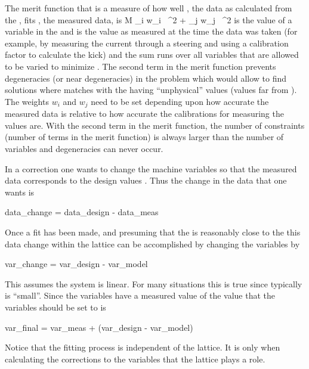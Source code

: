 The merit function  that is a measure of how
well , the data as calculated from the , fits
, the measured data, is
\Begineq
  {\cal M} \equiv \sum_{i} w_i \,
    ^2 + 
  \sum_{j} w_j \,
    ^2
  \label{m1}
\Endeq
{} is the value of a variable in the  and
 is the value as measured at the time the data was taken
(for example, by measuring the current through a steering and using a
calibration factor to calculate the kick) and the sum  runs over
all variables that are allowed to be varied to minimize .  The
second term in the merit function prevents degeneracies (or near
degeneracies) in the problem which would allow \tao to find solutions
where  matches  with the
 having ``unphysical'' values (values far from
). The weights $w_i$ and $w_j$ need to be set depending
upon how accurate the measured data is relative to how accurate the
calibrations for measuring the  values are. With the
second term in the merit function, the number of constraints (number of
terms in the merit function) is always larger than the number of
variables and degeneracies can never occur.

In a correction one wants to change the machine variables so that the
measured data corresponds to the design values . Thus
the change in the data that one wants is
\begin{example}
  data_change = data_design - data_meas
\end{example}
Once a fit has been made, and presuming that the  is
reasonably close to the  this data change within the
 lattice can be accomplished by changing the variables by
\begin{example}
  var_change = var_design - var_model
\end{example}
This assumes the system is linear. For many situations this is true
since typically  is ``small''. Since the variables have
a measured value of  the value that the variables should
be set to is
\begin{example}
  var_final = var_meas + (var_design - var_model)
\end{example}
Notice that the fitting process is independent of the 
lattice. It is only when calculating the corrections to the
variables that the  lattice plays a role. 

